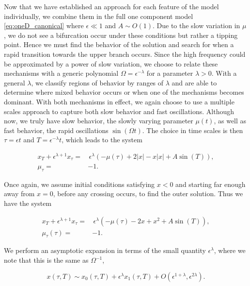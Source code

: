 Now that we have established an approach for each feature of the model individually, we combine them in the full one component model \eqref{eq:oneD_canonical} where $\epsilon\ll 1$ and ${A\sim O(1)}$. Due to the slow variation in $\mu$, we do not see a bifurcation occur under these conditions but rather a tipping point. Hence we must find the behavior of the solution and search for when a rapid transition towards the upper branch occurs. Since the high frequency could be approximated by a power of slow variation, we choose to relate these mechanisms with a generic polynomial $\Omega = \epsilon^{-\lambda}$ for a parameter $\lambda>0$. With a general $\lambda$, we classify regions of behavior by ranges of $\lambda$ and are able to determine where mixed behavior occurs or when one of the mechanisms becomes dominant. With both mechanisms in effect, we again choose to use a multiple scales approach to capture both slow behavior and fast oscillations. Although now, we truly have slow behavior, the slowly varying parameter $\mu(t)$, as well as fast behavior, the rapid oscillations $\sin(\Omega t)$. The choice in time scales is then $\tau=\epsilon t$ and $T=\epsilon^{-\lambda} t$, which leads to the system

\begin{equation*}
\begin{aligned}
x_T+\epsilon^{\lambda+1}x_\tau =&\, \epsilon^\lambda (-\mu(\tau)+2|x|-x|x|+A\sin(T)),\\
\mu_\tau=&-1.
\end{aligned}
\end{equation*}

\indent Once again, we assume initial conditions satisfying $x<0$ and starting far enough away from $x=0$, before any crossing occurs, to find the outer solution. Thus we have the system

\begin{equation}\label{eq:oneD_slowosc_outereq}
\begin{aligned}
x_T+\epsilon^{\lambda+1}x_\tau =& \, \epsilon^\lambda (-\mu(\tau)-2x+x^2+A\sin(T)),\\
\mu_\tau(\tau)=&-1.
\end{aligned}
\end{equation}

We perform an asymptotic expansion in terms of the small quantity $\epsilon^\lambda$, where we note that this is the same as $\Omega^{-1}$,

\begin{equation}\label{eq:oneD_slowosc_asympexpansion}
x(\tau,T)\sim x_0(\tau,T)+\epsilon^\lambda x_1(\tau,T)+O(\epsilon^{1+\lambda},\epsilon^{2\lambda}).
\end{equation}


